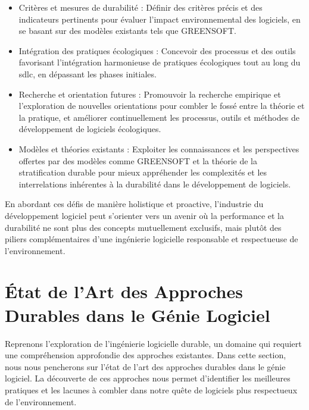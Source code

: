\begin{itemize}
    \item Critères et mesures de durabilité : Définir des critères précis et des indicateurs pertinents pour évaluer l'impact environnemental des logiciels, en se basant sur des modèles existants tels que GREENSOFT.
    \item Intégration des pratiques écologiques : Concevoir des processus et des outils favorisant l'intégration harmonieuse de pratiques écologiques tout au long du \acrshort{sdlc}, en dépassant les phases initiales.
    \item Recherche et orientation futures : Promouvoir la recherche empirique et l'exploration de nouvelles orientations pour combler le fossé entre la théorie et la pratique, et améliorer continuellement les processus, outils et méthodes de développement de logiciels écologiques.
    \item Modèles et théories existants : Exploiter les connaissances et les perspectives offertes par des modèles comme GREENSOFT et la théorie de la stratification durable pour mieux appréhender les complexités et les interrelations inhérentes à la durabilité dans le développement de logiciels.
\end{itemize}

En abordant ces défis de manière holistique et proactive, l'industrie du développement logiciel peut s'orienter vers un avenir où la performance et la durabilité ne sont plus des concepts mutuellement exclusifs, mais plutôt des piliers complémentaires d'une ingénierie logicielle responsable et respectueuse de l'environnement.


\section{État de l'Art des Approches Durables dans le Génie Logiciel}\label{sec:approches-durables}

Reprenons l'exploration de l'ingénierie logicielle durable, un domaine qui requiert une compréhension approfondie des approches existantes. Dans cette section, nous nous pencherons sur l'état de l'art des approches durables dans le génie logiciel. La découverte de ces approches nous permet d'identifier les meilleures pratiques et les lacunes à combler dans notre quête de logiciels plus respectueux de l'environnement.

